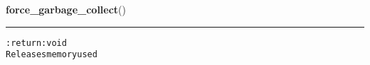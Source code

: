     \vspace{0.5ex}

\hspace{.8\funcindent}\begin{boxedminipage}{\funcwidth}

    \raggedright \textbf{force\_garbage\_collect}()

    \vspace{-1.5ex}

    \rule{\textwidth}{0.5\fboxrule}
\setlength{\parskip}{2ex}
\begin{alltt}

:return: void
    Releases memory used
\end{alltt}

\setlength{\parskip}{1ex}
    \end{boxedminipage}

